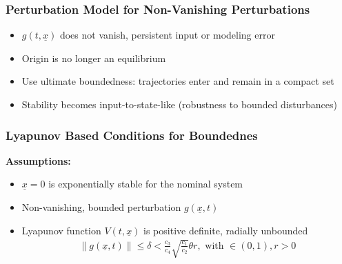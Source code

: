 \documentclass[student, noshadow, lsr, english, aspectratio=169, t]{ITR_LSR_slides}
\begin{document}
\begin{frame}
	\frametitle{Perturbation Model for Non-Vanishing Perturbations}
	\begin{itemize}
        \item $g(t,\underline{x})$ does not vanish, persistent input or modeling error
        \item Origin is no longer an equilibrium
        \item Use ultimate boundedness: trajectories enter and remain in a compact set
        \item Stability becomes input-to-state-like (robustness to bounded disturbances)
    \end{itemize}
\end{frame}

\begin{frame}
	\frametitle{Lyapunov Based Conditions for Boundednes}
	\textbf{Assumptions:}
	\begin{itemize}
		\item $\underline{x}=0$ is exponentially stable for the nominal system
        \item Non-vanishing, bounded perturbation $g(\underline{x},t)$
        \item Lyapunov function $V(t,\underline{x})$ is positive definite, radially unbounded
		\begin{align*}
			\|g(\underline{x},t)\| \leq \delta<\frac{c_3}{c_4}\sqrt{\frac{c_1}{c_2}}\theta r, \text{ with } \in(0,1), r>0
		\end{align*}
	\end{itemize}
\end{frame}
\end{document}
